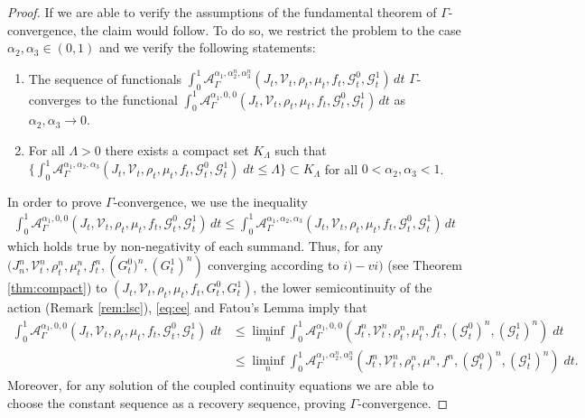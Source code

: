 \documentclass{article}
\def\calA{{\mathcal A}} \def\calB{{\mathcal B}} \def\calC{{\mathcal C}}
\def\calG{{\mathcal G}} \def\calH{{\mathcal H}} \def\calI{{\mathcal I}}
\begin{document}
\begin{proof}
    If we are able to verify the assumptions of the fundamental theorem of $\Gamma$-convergence, the claim would follow. To do so, we restrict the problem to the case $\alpha_2, \alpha_3\in (0,1)$ and we verify the following statements:
    \begin{enumerate}
        \item The sequence of functionals $\int_{0}^{1} \calA_\Gamma^{\alpha_1, \alpha_2^n, \alpha_3^n}(J_t, \mathcal{V}_t, \rho_t, \mu_t, f_t, \calG_t^0, \calG_t^1)\, dt$ $\Gamma$-converges to the functional $\int_{0}^{1} \calA_\Gamma^{\alpha_1, 0, 0}(J_t, \mathcal{V}_t, \rho_t, \mu_t, f_t, \calG_t^0, \calG_t^1)\, dt$ as $\alpha_2, \alpha_3\to 0$.
        \item For all $\Lambda>0$ there exists a compact set $K_\Lambda$ such that $\{\int_{0}^{1} \calA_\Gamma^{\alpha_1, \alpha_2, \alpha_3}(J_t, \mathcal{V}_t, \rho_t, \mu_t, f_t, \calG_t^0, \calG_t^1)\; dt \leq \Lambda\}\subset K_\Lambda$ for all $0<\alpha_2, \alpha_3<1$.
    \end{enumerate}
    In order to prove $\Gamma$-convergence, we use the inequality
    \begin{align}\label{eq:ee}
        \int_{0}^{1} \calA_\Gamma^{\alpha_1, 0, 0}(J_t, \mathcal{V}_t, \rho_t, \mu_t, f_t, \calG_t^0, \calG_t^1)\, dt \leq \int_{0}^{1} \calA_\Gamma^{\alpha_1, \alpha_2, \alpha_3}(J_t, \mathcal{V}_t, \rho_t, \mu_t, f_t, \calG_t^0, \calG_t^1)\, dt
    \end{align}
    which holds true by non-negativity of each summand. 
    Thus, for any $(J_n^{n}, \mathcal{V}_t^{n}, \rho_t^{n}, \mu_t^{n}, f_t^{n}, ({G_t^0)^{n}, (G_t^1)^{n}})$ converging according to $i) - vi)$ (see Theorem \ref{thm:compact}) to $(J_t, \mathcal{V}_t, \rho_t, \mu_t, f_t, G_t^0, G_t^1)$, the lower semicontinuity of the action (Remark \ref{rem:lsc}), \eqref{eq:ee} and Fatou's Lemma imply that
    \begin{align*}
        \int_{0}^{1} \calA_\Gamma^{\alpha_1, 0, 0}(J_t, \mathcal{V}_t, \rho_t, \mu_t, f_t, {\calG_t^0}, {\calG_t^1})\; dt &\leq \liminf\limits_{n}\int_{0}^{1} \calA_\Gamma^{\alpha_1, 0, 0}(J_t^{n}, \mathcal{V}_t^{n}, \rho_t^{n}, \mu_t^{n}, f_t^{n}, (\calG_t^0)^{n}, (\calG_t^1)^{n})\; dt \\
        &\leq \liminf\limits_{n} \int_{0}^{1} \calA_\Gamma^{\alpha_1, \alpha^n_2, \alpha^n_3}(J_t^{n}, \mathcal{V}_t^{n}, \rho_t^{n}, \mu^{n}, f^{n}, (\calG_t^0)^{n}, (\calG_t^1)^{n})\; dt .
    \end{align*}
    Moreover, for any solution of the coupled continuity equations we are able to choose the constant sequence as a recovery sequence, proving $\Gamma$-convergence. 

\end{proof}
\end{document}
